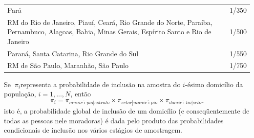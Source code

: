 \documentclass[]{book}
\numberwithin{example}{chapter}
\numberwithin{remark}{chapter}
\numberwithin{definition}{chapter}
\begin{document}
\begin{longtable}[]{@{}lc@{}}
\begin{minipage}[t]{0.75\columnwidth}
Pará\strut
\end{minipage} & \begin{minipage}[t]{0.19\columnwidth}\centering\strut
1/350\strut
\end{minipage}\tabularnewline
\begin{minipage}[t]{0.75\columnwidth}\raggedright\strut
RM do Rio de Janeiro, Piauí, Ceará, Rio Grande do Norte, Paraíba,
Pernambuco, Alagoas, Bahia, Minas Gerais, Espírito Santo e Rio de
Janeiro\strut
\end{minipage} & \begin{minipage}[t]{0.19\columnwidth}\centering\strut
1/500\strut
\end{minipage}\tabularnewline
\begin{minipage}[t]{0.75\columnwidth}\raggedright\strut
Paraná, Santa Catarina, Rio Grande do Sul\strut
\end{minipage} & \begin{minipage}[t]{0.19\columnwidth}\centering\strut
1/550\strut
\end{minipage}\tabularnewline
\begin{minipage}[t]{0.75\columnwidth}\raggedright\strut
RM de São Paulo, Maranhão, São Paulo\strut
\end{minipage} & \begin{minipage}[t]{0.19\columnwidth}\centering\strut
1/750\strut
\end{minipage}\tabularnewline
\bottomrule
\end{longtable}

Se \({\ \pi }_{i}\)representa a probabilidade de inclusão na amostra do
\(i\)-ésimo domicílio da população, \(i=1,...,N\), então \[
\pi _{i}=\pi _{munic\acute{\imath}pio\left| estrato\right. }\times \pi
_{setor\left| munic\acute{\imath}pio\right. }\times \pi _{domic\acute{\imath}
lio\left| setor\right. } 
\] isto é, a probabilidade global de inclusão de um domicílio (e
conseqüentemente de todas as pessoas nele moradoras) é dada pelo produto
das probabilidades condicionais de inclusão nos vários estágios de
amostragem.
\end{document}

